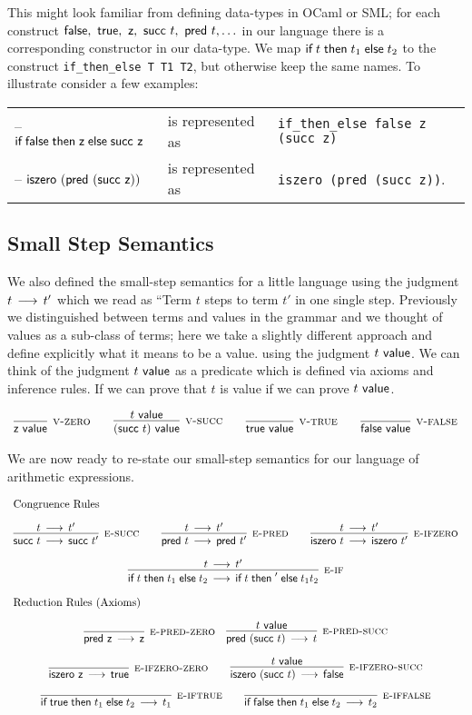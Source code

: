 This might look familiar from defining data-types in OCaml or SML; for each
construct $\textsf{false},~\textsf{true},~\textsf{z},~ \textsf{succ}~t,~\textsf{pred}~t, \ldots$ in our
language there is a corresponding constructor in our data-type. We map 
$\textsf{if\;} t \textsf{\;then\;} t_1 \textsf{\;else\;} t_2$ to the construct \lstinline!if_then_else T T1 T2!, but otherwise keep the
same names. To illustrate consider a few examples:

\begin{tabular}{lll}
-- $\textsf{if\;} \textsf{false} \textsf{\;then\;} \textsf{z} \textsf{\;else\;} \textsf{succ}~\textsf{z}$ & is represented as  &
\lstinline!if_then_else false z (succ z)!\\
-- $\textsf{iszero}~(\textsf{pred}~(\textsf{succ}~\textsf{z}))$ & is represented as & \lstinline!iszero (pred (succ z))!.  
\end{tabular}

\subsection{Small Step Semantics}
We also defined the small-step semantics for a little language using the
judgment $t \mathrel{\,\longrightarrow\,} t'$ which we read as ``Term $t$ steps to term $t'$ in one
single step. Previously we distinguished between terms and values in the
grammar and we thought of values as a sub-class of terms; here we take a slightly
different approach and define explicitly what it means to be a value.
using the judgment $t ~\textsf{value}$. We can think of the judgment $t ~\textsf{value}$ as a
predicate which is defined via axioms and inference rules. If we can prove that
$t$ is value if we can prove $t ~\textsf{value}$.


\[
\begin{array}{c}
\infer[\Vzero]{\tmzero \isv}{} \qquad \infer[\Vsuc]{(\tmsucc t) \isv}{t \isv}
\qquad \infer[\Vtrue]{\tmtrue \isv}{}
\qquad \infer[\Vfalse]{\tmfalse \isv}{}
\end{array}
\]

We are now ready to re-state our small-step semantics for our language of
arithmetic expressions.

\[
\begin{array}{c}
\multicolumn{1}{l}{\mbox{\text{Congruence Rules}}}\\[1em]
\infer[\SSUC]{\tmsucc t \steps \tmsucc t'}{t \steps t'}
\qquad 
\infer[\SPRED]{\tmpred t \steps \tmpred t'}{t \steps t'} \qquad
\infer[\SISZERO]{\tmiszero t \steps \tmiszero t'}{t \steps t'}
\\[1em]
\infer[\SIF]{\tmif t {t_1}{t_2} \steps \tmif t' {t_1}{t_2}}{t \steps t'}
\\[1em]
\multicolumn{1}{l}{\mbox{\text{Reduction Rules (Axioms)}}}\\[1em]
\infer[\SPREDZ]{\tmpred \tmzero \steps \tmzero}{}\quad
\infer[\SPREDSUCC]{\tmpred (\tmsucc t) \steps t}{t \isv}\\[1em]
\infer[\SISZEROZ]{\tmiszero \tmzero \steps \tmtrue}{} \qquad
\infer[\SISZEROSUCC]{\tmiszero (\tmsucc t) \steps \tmfalse}{t \isv} \\[1em]
\infer[\SIFT]{\tmif \tmtrue {t_1}{t_2} \steps t_1}{}\qquad
\infer[\SIFF]{\tmif \tmfalse {t_1}{t_2} \steps t_2}{}
\end{array}
\]

